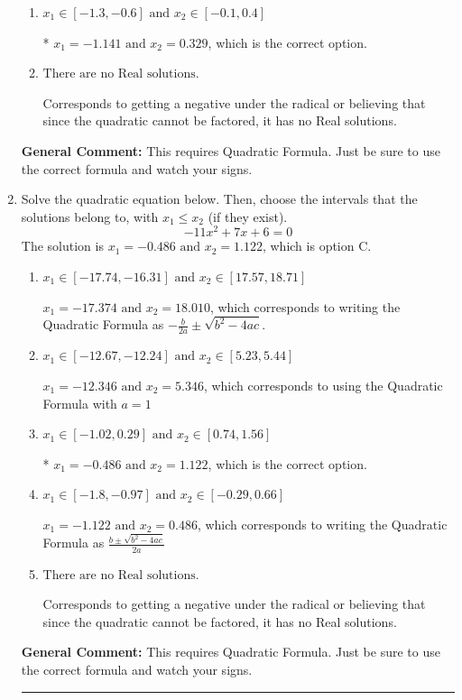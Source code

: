\documentclass{extbook}[14pt]
\newcommand{\litem}[1]{\item #1

\rule{\textwidth}{0.4pt}}
\begin{document}
\begin{enumerate}
{\begin{enumerate}[label=\Alph*.]
 $x_1 = -0.329 \text{ and } x_2 = 1.141$, which corresponds to writing the Quadratic Formula as $\frac{b \pm \sqrt{b^2 - 4ac}}{2a}$
\item \( x_1 \in [-1.3, -0.6] \text{ and } x_2 \in [-0.1, 0.4] \)

* $x_1 = -1.141 \text{ and } x_2 = 0.329$, which is the correct option.
\item \( \text{There are no Real solutions.} \)

Corresponds to getting a negative under the radical or believing that since the quadratic cannot be factored, it has no Real solutions.
\end{enumerate}

\textbf{General Comment:} This requires Quadratic Formula. Just be sure to use the correct formula and watch your signs.
}
\litem{
Solve the quadratic equation below. Then, choose the intervals that the solutions belong to, with $x_1 \leq x_2$ (if they exist).
\[ -11x^{2} +7 x + 6 = 0 \]The solution is \( x_1 = -0.486 \text{ and } x_2 = 1.122 \), which is option C.\begin{enumerate}[label=\Alph*.]
\item \( x_1 \in [-17.74, -16.31] \text{ and } x_2 \in [17.57, 18.71] \)

 $x_1 = -17.374 \text{ and } x_2 = 18.010$, which corresponds to writing the Quadratic Formula as $-\frac{b}{2a} \pm \sqrt{b^2 - 4ac}$.
\item \( x_1 \in [-12.67, -12.24] \text{ and } x_2 \in [5.23, 5.44] \)

 $x_1 = -12.346 \text{ and } x_2 = 5.346$, which corresponds to using the Quadratic Formula with $a=1$
\item \( x_1 \in [-1.02, 0.29] \text{ and } x_2 \in [0.74, 1.56] \)

* $x_1 = -0.486 \text{ and } x_2 = 1.122$, which is the correct option.
\item \( x_1 \in [-1.8, -0.97] \text{ and } x_2 \in [-0.29, 0.66] \)

 $x_1 = -1.122 \text{ and } x_2 = 0.486$, which corresponds to writing the Quadratic Formula as $\frac{b \pm \sqrt{b^2 - 4ac}}{2a}$
\item \( \text{There are no Real solutions.} \)

Corresponds to getting a negative under the radical or believing that since the quadratic cannot be factored, it has no Real solutions.
\end{enumerate}

\textbf{General Comment:} This requires Quadratic Formula. Just be sure to use the correct formula and watch your signs.
}
\end{enumerate}
\end{document}
